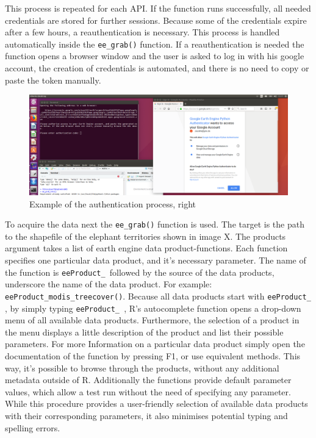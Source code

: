 This process is repeated for each API. If the function runs successfully, all needed credentials are stored for further sessions. Because some of the credentials expire after a few hours, a reauthentication is necessary. This process is handled automatically inside the \texttt{ee\_grab()} function. If a reauthentication is needed the function opens a browser window and the user is asked to log in with his google account, the creation of credentials is automated, and there is no need to copy or paste the token manually.

\begin{center}
	\begin{figure}[h]
		\begin{center}
			\includegraphics[width=15cm]{images/install_authentication.png}
			\caption{Example of the authentication process, right}
			\label{install}
		\end{center}
	\end{figure}
\end{center}



To acquire the data next the \texttt{ee\_grab()} function is used. The target is the path to the shapefile of the elephant territories shown in image X. The products argument takes a list of earth engine data product-functions. Each function specifies one particular data product, and it's necessary parameter. The name of the function is \texttt{eeProduct\_ }followed by the source of the data products, underscore the name of the data product. For example: \texttt{eeProduct\_modis\_treecover()}. Because all data products start with \texttt{eeProduct\_ }, by simply typing \texttt{eeProduct\_ }, R's autocomplete function opens a drop-down menu of all available data products. Furthermore, the selection of a product in the menu displays a little description of the product and list their possible parameters. For more Information on a particular data product simply open the documentation of the function by pressing F1, or use equivalent methods. This way, it's possible to browse through the products, without any additional metadata outside of R. Additionally the functions provide default parameter values, which allow a test run without the need of specifying any parameter. While this procedure provides a user-friendly selection of available data products with their corresponding parameters, it also minimises potential typing and spelling errors.

